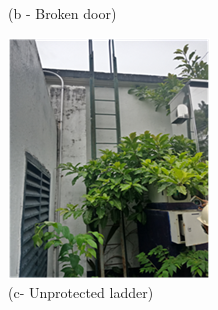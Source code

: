 \begin{figure}[!h]
\begin{minipage}[b]{0.22\linewidth}
		\caption*{(b - Broken door)}
	\end{minipage}
	\hspace{0.03cm}
	\begin{minipage}[b]{0.22\linewidth}
		\centering
		\includegraphics[width=\textwidth]{figures/fig_ch04_fdas_unprotectedladder}
		\caption*{(c- Unprotected ladder)}
	\end{minipage}
	\hspace{0.03cm}
	\begin{minipage}[b]{0.22\linewidth}
		\centering

\end{minipage}
\end{figure}
